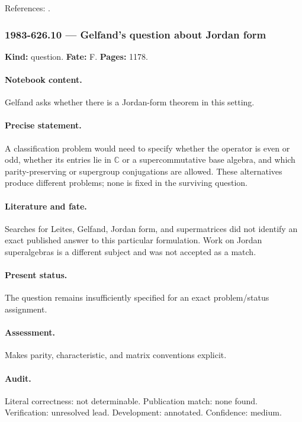 \noindent References: \citep{kac1977sketch}.\par

\subsubsection{1983-626.10 --- Gelfand’s question about Jordan form}

\label{item:1983-626.10}

\noindent\textbf{Kind:} question. \textbf{Fate:} F. \textbf{Pages:} 1178.\par

\paragraph{Notebook content.} Gelfand asks whether there is a Jordan-form theorem in this setting.

\paragraph{Precise statement.} A classification problem would need to specify whether the operator is even or odd, whether its entries lie in \(\mathbb C\) or a supercommutative base algebra, and which parity-preserving or supergroup conjugations are allowed. These alternatives produce different problems; none is fixed in the surviving question.

\paragraph{Literature and fate.} Searches for Leites, Gelfand, Jordan form, and supermatrices did not identify an exact published answer to this particular formulation. Work on Jordan superalgebras is a different subject and was not accepted as a match.

\paragraph{Present status.} The question remains insufficiently specified for an exact problem/status assignment.

\paragraph{Assessment.} Makes parity, characteristic, and matrix conventions explicit.

\paragraph{Audit.} Literal correctness: not determinable. Publication match: none found. Verification: unresolved lead. Development: annotated. Confidence: medium.

